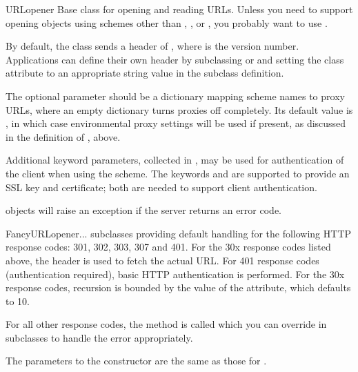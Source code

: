 \begin{classdesc}{URLopener}{}
Base class for opening and reading URLs.  Unless you need to support
opening objects using schemes other than , ,
 or , you probably want to use
.

By default, the  class sends a
 header of , where
 is the  version number.  Applications can
define their own  header by subclassing
 or  and setting the class
attribute  to an appropriate string value in the
subclass definition.

The optional  parameter should be a dictionary mapping
scheme names to proxy URLs, where an empty dictionary turns proxies
off completely.  Its default value is , in which case
environmental proxy settings will be used if present, as discussed in
the definition of , above.

Additional keyword parameters, collected in , may be used for
authentication of the client when using the  scheme.  The keywords
 and  are supported to provide an 
SSL key and certificate; both are needed to support client authentication.

 objects will raise an  exception
if the server returns an error code.
\end{classdesc}

\begin{classdesc}{FancyURLopener}{...}
 subclasses  providing default
handling for the following HTTP response codes: 301, 302, 303, 307 and
401.  For the 30x response codes listed above, the
 header is used to fetch the actual URL.  For 401
response codes (authentication required), basic HTTP authentication is
performed.  For the 30x response codes, recursion is bounded by the
value of the  attribute, which defaults to 10.

For all other response codes, the method 
is called which you can override in subclasses to handle the error
appropriately.


The parameters to the constructor are the same as those for
.

\end{classdesc}

